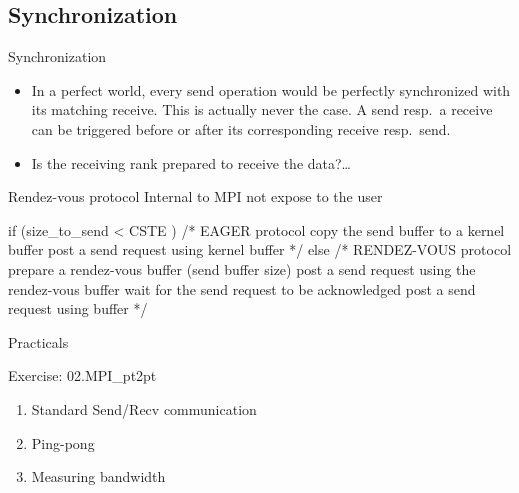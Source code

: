 \documentclass[aspectratio=43]{beamer}
\begin{document}
\subsection{Synchronization}
\begin{frame}[fragile]{Synchronization}
\justifying
\begin{itemize}
\item In a perfect world, every send operation would be perfectly synchronized with its matching receive.
This is actually never the case.
A send resp.\ a receive can be triggered before or after its corresponding receive resp.\ send.\\
\item Is the receiving rank prepared to receive the data?\ldots
\end{itemize}
\begin{blue1block}{Rendez-vous protocol}
{\color{cscsred}Internal to MPI not expose to the user}
\begin{Cpplisting}{}
  if (size_to_send < CSTE ) {
     /* EAGER protocol
     copy the send buffer to a kernel buffer
     post a send request using kernel buffer */
  } else {
     /* RENDEZ-VOUS protocol
     prepare a rendez-vous buffer (send buffer size)
     post a send request using the rendez-vous buffer
     wait for the send request to be acknowledged
     post a send request using buffer */
  }
\end{Cpplisting}
\end{blue1block}
\end{frame}

\begin{frame}{Practicals}
    \begin{brown2block}{Exercise: 02.MPI\_pt2pt}
    \begin{enumerate}
    \item  Standard Send/Recv communication
    \item  Ping-pong
    \item  Measuring bandwidth
    \end{enumerate}
    \end{brown2block}
\end{frame}
\end{document}
